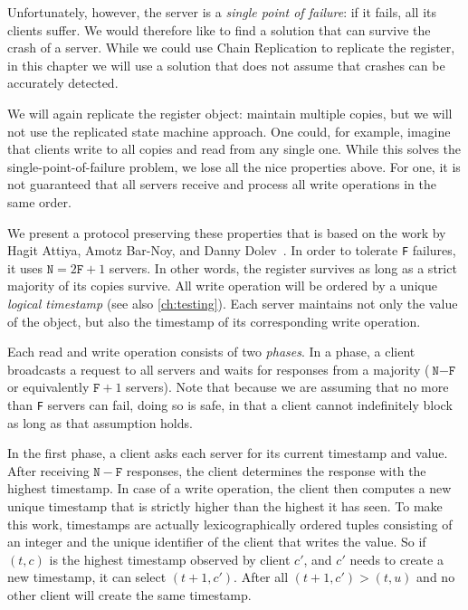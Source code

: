 \documentclass{report}
\begin{document}
%
Unfortunately, however, the server is a \emph{single point of failure}:
if it fails, all its clients suffer.
We would therefore like to find a solution that can survive the crash
of a server.
While we could use Chain Replication to replicate the register, in
this chapter we will use a solution that does not assume that
crashes can be accurately detected.

We will again replicate the register object: maintain multiple copies,
but we will not use the replicated state machine approach.
One could, for example, imagine that clients write to all copies and read
from any single one.
While this solves the single-point-of-failure problem, we lose all the
nice properties above.  For one, it is not guaranteed that all servers
receive and process all write operations in the same order.

%
We present a protocol preserving these properties that is based on the
work by Hagit Attiya, Amotz Bar-Noy, and Danny Dolev~\cite{ABD95}.
In order to tolerate \texttt{F} failures,
it uses $\mathtt{N} = 2\mathtt{F} + 1$ servers.
In other words, the register survives as long as a strict majority of
its copies survive.
All write operation will be ordered by a unique \emph{logical timestamp}
(see also \autoref{ch:testing}).
Each server maintains not only the value of the object, but also the
timestamp of its corresponding write operation.

Each read and write operation consists of two \emph{phases}.  In a phase,
a client broadcasts a request to all servers and waits for responses
from a majority ($\texttt{N} - \texttt{F}$ or equivalently
$\texttt{F} + 1$ servers).  Note that because we are assuming that no
more than \texttt{F} servers can fail, doing so is safe, in that a client
cannot indefinitely block as long as that assumption holds.

In the first phase, a client asks each server for its current
timestamp and value.  After receiving $\mathtt{N} - \mathtt{F}$ responses,
the client determines the response with the highest timestamp.
In case of a write operation, the client then computes a new unique
timestamp that is strictly higher than the highest it has seen.
To make this work, timestamps are actually lexicographically ordered
tuples consisting of an integer and the unique identifier of the
client that writes the value.  So if $(t, c)$ is the highest timestamp
observed by client $c'$, and $c'$  needs to create a new timestamp,
it can select $(t + 1, c')$.
After all $(t + 1, c') > (t, u)$ and no other client
will create the same timestamp.
\end{document}
